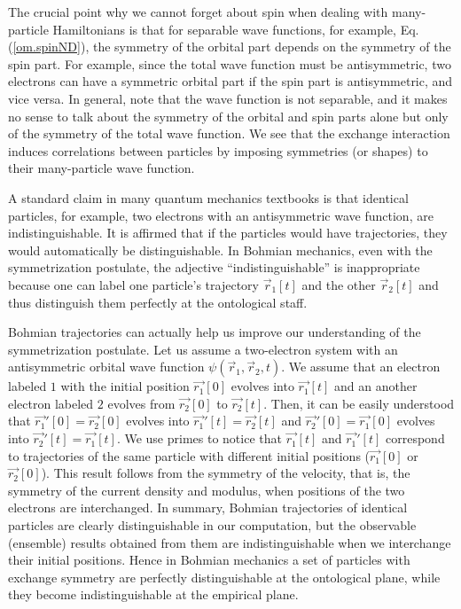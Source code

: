 \documentclass[nofootinbib, secnumarabic, amsmath, nobibnotes,10pt,aps,pra]{revtex4-1}
\newcommand{\eref}[1]{Eq. (\ref{#1})}
\begin{document}
The crucial point why we cannot forget about spin when dealing with
many-particle Hamiltonians is that for separable wave
functions, for example, \eref{om.spinND}, the symmetry of the
orbital part depends on the symmetry of the spin part. For example,
since the total wave function must be antisymmetric, two electrons
can have a symmetric orbital part if the spin part is antisymmetric,
and vice versa. In general, note that the wave function is not
separable, and it makes no sense to talk about the symmetry of the
orbital and spin parts alone but only of the symmetry of the total
wave function. We see that the exchange interaction induces
correlations between particles by imposing symmetries (or shapes) to
their many-particle wave function.\enlargethispage{-1pc}

A standard claim in many quantum mechanics textbooks is that identical particles, for example, two electrons with an antisymmetric wave function, are indistinguishable. It is affirmed that if the particles would have trajectories, they would automatically be distinguishable. In Bohmian mechanics, even with the symmetrization postulate, the adjective ``indistinguishable'' is inappropriate because one can label one particle's trajectory $\vec r_1[t]$ and the other $\vec r_2[t]$ and thus distinguish them perfectly at the ontological staff.

Bohmian trajectories can actually help us improve our understanding of the symmetrization postulate. Let us assume a two-electron system with an antisymmetric orbital wave function $\psi(\vec r_1,\vec r_2,t)$. We assume that an electron labeled $1$ with the initial position $\vec {r_1}[0]$ evolves into $\vec {r_1}[t]$ and an another electron labeled $2$ evolves from $\vec {r_2}[0]$ to $\vec {r_2}[t]$. Then, it can be easily understood that $\vec {r_1}'[0] = \vec {r_2}[0]$ evolves into $\vec {r_1}'[t] = \vec {r_2}[t]$ and $\vec {r_2}'[0] = \vec {r_1}[0]$ evolves into $\vec {r_2}'[t] = \vec {r_1}[t]$. We use primes to notice that $\vec {r_1}[t]$ and $\vec {r_1}'[t]$ correspond to trajectories of the same particle with different initial positions ($\vec {r_1}[0]$ or $\vec {r_2}[0]$).
This result follows from the symmetry of the velocity, that is, the symmetry of the current density and modulus, when positions of the two electrons are interchanged. In summary, Bohmian trajectories of identical particles are clearly distinguishable in our computation, but the observable (ensemble) results obtained from them are indistinguishable when we interchange their initial positions. Hence in Bohmian mechanics a set of particles with exchange symmetry are perfectly distinguishable at the ontological plane, while they become indistinguishable at the empirical plane. 
\end{document}
